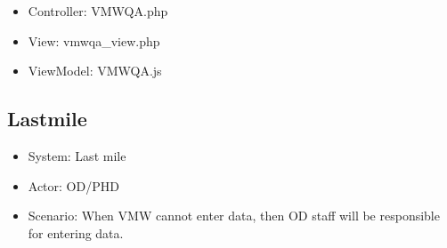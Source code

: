\documentclass[letterpaper,10pt,english,openany,oneside]{sphinxmanual}
\begin{document}
\begin{sphinxVerbatim}[commandchars=\\\{\}]
          
\end{sphinxVerbatim}
\begin{itemize}
\item {} 
\sphinxAtStartPar
Controller: VMWQA.php

\item {} 
\sphinxAtStartPar
View: vmwqa\_view.php

\item {} 
\sphinxAtStartPar
ViewModel: VMWQA.js

\end{itemize}


\subsection{Lastmile}
\label{\detokenize{module/module:lastmile}}\begin{itemize}
\item {} 
\sphinxAtStartPar
System: Last mile

\item {} 
\sphinxAtStartPar
Actor: OD/PHD

\item {} 
\sphinxAtStartPar
Scenario: When VMW cannot enter data, then OD staff will be responsible for entering data.

\end{itemize}
\end{document}
